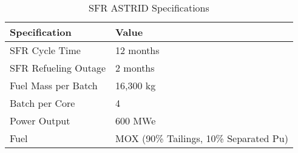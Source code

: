 \begin{table}[h]
	\centering
	\begin{tabularx}{\textwidth}{bb}
		\hline
		Specification & Value \\
		\hline
		SFR Cycle Time & 12 months \\ 
		SFR Refueling Outage & 2 months \\
		Fuel Mass per Batch & 16,300 kg \\
		Batch per Core & 4 \\
		Power Output & 600 MWe \\
		Fuel & {\small \gls{MOX} (90\% Tailings, 10\% Separated Pu)}\\
		\hline
	\end{tabularx}
	\caption {\gls{SFR} ASTRID Specifications}
	\cite{marsaultmarie-sophie_pre-conceptual_2012}
	\label{tab:sfr}
\end{table}

